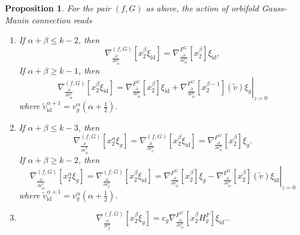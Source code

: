 \documentclass[reqno,12pt]{amsart}
\numberwithin{equation}{section}
\theoremstyle{plain}
\newtheorem{proposition}[theorem]{Proposition}
\theoremstyle{definition}
\newcommand{\id}{\mathrm{id}}
\numberwithin{equation}{section}
\begin{document}
\begin{proposition}{\label{EF5}}
    For the pair $(f,G)$ as above, the action of orbifold Gauss-Manin connection reads
\begin{enumerate}
\item
If $\alpha+\beta \le k-2$, then
\[
\nabla_{\frac{\partial}{\partial v^\alpha_{\id}}}^{(f,G)}[x_2^{\beta}\xi_{\id}] = \nabla^{F^G}_{\frac{\partial}{\partial v^\alpha_{\id}}}[x_2^{\beta}]\xi_{\id},
\]
If $\alpha+\beta \ge k-1$, then
\[\nabla_{\frac{\partial}{\partial v^\alpha_{\id}}}^{(f,G)}[x_2^{\beta}\xi_{\id}] = \nabla^{F^G}_{\frac{\partial}{\partial v^\alpha_{\id}}}[x_2^{\beta}]\xi_{\id}  +\left.\nabla^{F^G}_{\frac{\partial}{\partial v^\alpha_\id}}[x_2^{\beta-1}] (\widetilde v) \xi_{g}\right\vert_{z=0}
\]
where $\widetilde v^{\alpha+1}_\id = v_g^{\alpha} (\alpha + \frac{1}{2})$.

\item If $\alpha+\beta \le k-3$, then
\[
\nabla_{\frac{\partial}{\partial v^\beta_\id}}^{(f,G)}[x_2^{\alpha}\xi_g] = \nabla_{\frac{\partial}{\partial v^\alpha_{g}}}^{(f,G)}[x_2^{\beta}\xi_\id] =  \nabla^{F^G}_{\frac{\partial}{\partial v^\alpha_\id}}[x_2^{\beta}]\xi_{g}.
\]
If $\alpha+\beta \ge k-2$, then
\[
\nabla_{\frac{\partial}{\partial v^\beta_\id}}^{(f,G)}[x_2^{\alpha}\xi_g] = \nabla_{\frac{\partial}{\partial v^\alpha_{g}}}^{(f,G)}[x_2^{\beta}\xi_\id] = \nabla^{F^G}_{\frac{\partial}{\partial v^\alpha_\id}}[x_2^{\beta}]\xi_{g} 
- \left.\nabla^{F^G}_{\frac{\partial}{\partial v^\alpha_\id}}[x_2^{\beta}] (\widetilde v) \xi_\id\right\vert_{z=0}
\]
where $\widetilde v^{\alpha+1}_\id = v_g^{\alpha} (\alpha + \frac{1}{2})$.
\item 
\[
    \nabla_{\frac{\partial}{\partial v^\alpha_{g}}}^{(f,G)}[x_2^\beta\xi_{g}] = c_g\nabla_{\frac{\partial}{\partial v^\alpha_{\id}}}^{F^G}[x_2^\beta  H_g^F]\xi_{\id}..
\]
\end{enumerate}
\end{proposition}
\end{document}
